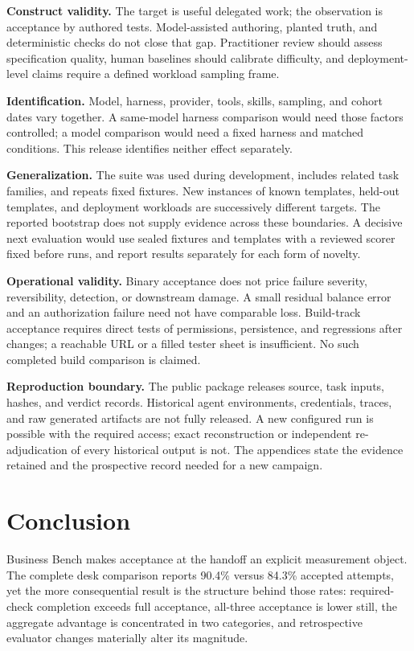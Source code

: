\textbf{Construct validity.} The target is useful delegated work; the observation is acceptance by authored tests. Model-assisted authoring, planted truth, and deterministic checks do not close that gap. Practitioner review should assess specification quality, human baselines should calibrate difficulty, and deployment-level claims require a defined workload sampling frame.

\textbf{Identification.} Model, harness, provider, tools, skills, sampling, and cohort dates vary together. A same-model harness comparison would need those factors controlled; a model comparison would need a fixed harness and matched conditions. This release identifies neither effect separately.

\textbf{Generalization.} The suite was used during development, includes related task families, and repeats fixed fixtures. New instances of known templates, held-out templates, and deployment workloads are successively different targets. The reported bootstrap does not supply evidence across these boundaries. A decisive next evaluation would use sealed fixtures and templates with a reviewed scorer fixed before runs, and report results separately for each form of novelty.

\textbf{Operational validity.} Binary acceptance does not price failure severity, reversibility, detection, or downstream damage. A small residual balance error and an authorization failure need not have comparable loss. Build-track acceptance requires direct tests of permissions, persistence, and regressions after changes; a reachable URL or a filled tester sheet is insufficient. No such completed build comparison is claimed.

\textbf{Reproduction boundary.} The public package releases source, task inputs, hashes, and verdict records. Historical agent environments, credentials, traces, and raw generated artifacts are not fully released. A new configured run is possible with the required access; exact reconstruction or independent re-adjudication of every historical output is not. The appendices state the evidence retained and the prospective record needed for a new campaign.


\section{Conclusion}\label{sec:9}

Business Bench makes acceptance at the handoff an explicit measurement object. The complete desk comparison reports 90.4\% versus 84.3\% accepted attempts, yet the more consequential result is the structure behind those rates: required-check completion exceeds full acceptance, all-three acceptance is lower still, the aggregate advantage is concentrated in two categories, and retrospective evaluator changes materially alter its magnitude.


